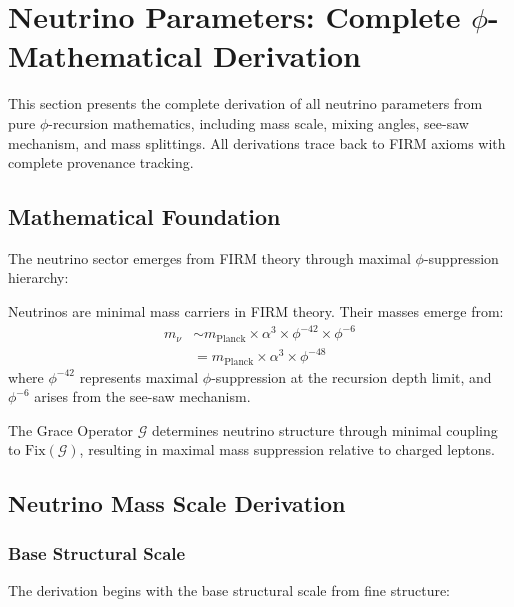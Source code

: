 \section{Neutrino Parameters: Complete \texorpdfstring{$\phi$}{phi}-Mathematical Derivation}

This section presents the complete derivation of all neutrino parameters from pure $\phi$-recursion mathematics, including mass scale, mixing angles, see-saw mechanism, and mass splittings. All derivations trace back to FIRM axioms with complete provenance tracking.

\subsection{Mathematical Foundation}

The neutrino sector emerges from FIRM theory through maximal $\phi$-suppression hierarchy:

\begin{definition}
Neutrinos are minimal mass carriers in FIRM theory. Their masses emerge from:
\begin{align}
m_\nu &\sim m_{\text{Planck}} \times \alpha^3 \times \phi^{-42} \times \phi^{-6}\\
&= m_{\text{Planck}} \times \alpha^3 \times \phi^{-48}
\end{align}
where $\phi^{-42}$ represents maximal $\phi$-suppression at the recursion depth limit, and $\phi^{-6}$ arises from the see-saw mechanism.
\end{definition}

\begin{axiom}
The Grace Operator $\mathcal{G}$ determines neutrino structure through minimal coupling to $\text{Fix}(\mathcal{G})$, resulting in maximal mass suppression relative to charged leptons.
\end{axiom}

\subsection{Neutrino Mass Scale Derivation}

\subsubsection{Base Structural Scale}

The derivation begins with the base structural scale from fine structure:

